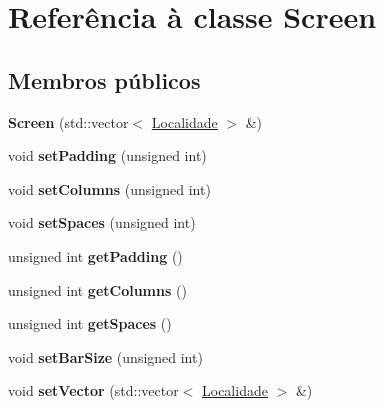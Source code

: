 \hypertarget{classScreen}{}\section{Referência à classe Screen}
\label{classScreen}
\subsection*{Membros públicos}
\begin{DoxyCompactItemize}
\item 
\mbox{\label{classScreen_ac7905724062398213802167f49dbe682}} 
{\bfseries Screen} (std\+::vector$<$ \hyperlink{classLocalidade}{Localidade} $>$ \&)
\item 
\mbox{\label{classScreen_a32771ff2a19f570bf35654e11971e938}} 
void {\bfseries set\+Padding} (unsigned int)
\item 
\mbox{\label{classScreen_aab086a891bb40b64d695e4f9472f9fb0}} 
void {\bfseries set\+Columns} (unsigned int)
\item 
\mbox{\label{classScreen_a48cdb71b110816e691a3ae6b6ae184df}} 
void {\bfseries set\+Spaces} (unsigned int)
\item 
\mbox{\label{classScreen_a47c6aa9d8996f04f79c5214b73b4f5f5}} 
unsigned int {\bfseries get\+Padding} ()
\item 
\mbox{\label{classScreen_ae99fb8d6447735b4e5a28c365cd0a547}} 
unsigned int {\bfseries get\+Columns} ()
\item 
\mbox{\label{classScreen_a763d02dde422f2d4fd2fe78a31cf4567}} 
unsigned int {\bfseries get\+Spaces} ()
\item 
\mbox{\label{classScreen_a4b0d87fae0ea0d1e45cee3ea2a9aa115}} 
void {\bfseries set\+Bar\+Size} (unsigned int)
\item 
\mbox{\label{classScreen_aa318aff3be88b93b8590e650b26cae2c}} 
void {\bfseries set\+Vector} (std\+::vector$<$ \hyperlink{classLocalidade}{Localidade} $>$ \&)
\item 
\mbox{\label{classScreen_a3ea61b376ace3fa90b16ba31b01a8107}} 

\end{DoxyCompactItemize}
